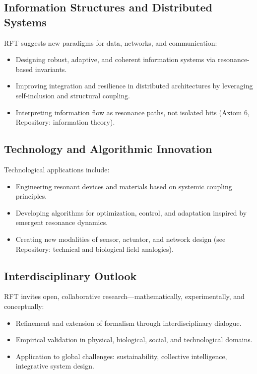 \documentclass[12pt]{article}
\begin{document}
\subsection{Information Structures and Distributed Systems}

RFT suggests new paradigms for data, networks, and communication:
\begin{itemize}
	\item Designing robust, adaptive, and coherent information systems via resonance-based invariants.
	\item Improving integration and resilience in distributed architectures by leveraging self-inclusion and structural coupling.
	\item Interpreting information flow as resonance paths, not isolated bits (Axiom 6, Repository: information theory).
\end{itemize}

\subsection{Technology and Algorithmic Innovation}

Technological applications include:
\begin{itemize}
	\item Engineering resonant devices and materials based on systemic coupling principles.
	\item Developing algorithms for optimization, control, and adaptation inspired by emergent resonance dynamics.
	\item Creating new modalities of sensor, actuator, and network design (see Repository: technical and biological field analogies).
\end{itemize}

\subsection{Interdisciplinary Outlook}

RFT invites open, collaborative research—mathematically, experimentally, and conceptually:
\begin{itemize}
	\item Refinement and extension of formalism through interdisciplinary dialogue.
	\item Empirical validation in physical, biological, social, and technological domains.
	\item Application to global challenges: sustainability, collective intelligence, integrative system design.
\end{itemize}
\end{document}
